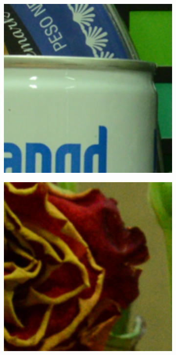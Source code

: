 \begin{figure}
\begin{subfigure}[t]{0.19\textwidth}
    \end{subfigure}
    \hfill
    \begin{subfigure}[t]{0.19\textwidth}
        \centering
        \includegraphics[width=1\textwidth]{images/guided/resize_CC_Noisy_Nikon_D800_ISO_1600_B3_82.png}
    \end{subfigure}
    \hfill
    \begin{subfigure}[t]{0.19\textwidth}
        \centering
        \includegraphics[width=1\textwidth]{images/guided/resize_CC_Noisy_Nikon_D800_ISO_3200_A4_51.png}

\end{subfigure}
\end{figure}

